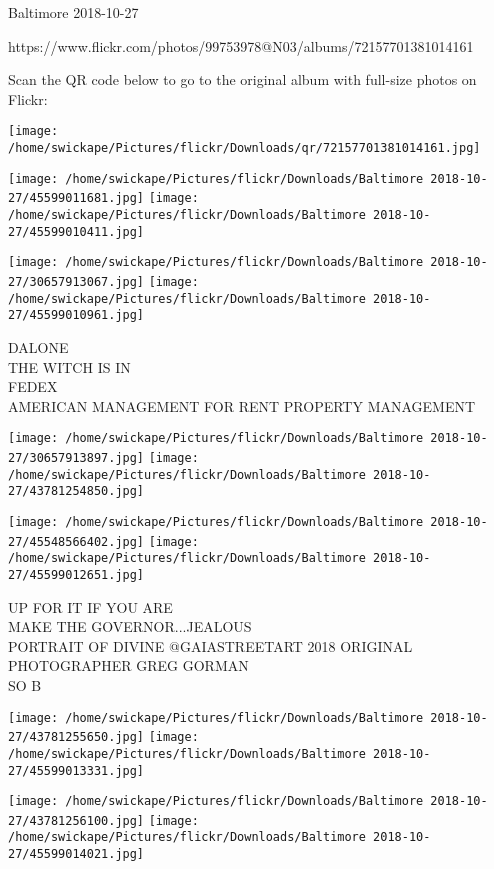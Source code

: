 \documentclass[10pt,letterpaper]{article}
\begin{document}
Baltimore 2018-10-27

https://www.flickr.com/photos/99753978@N03/albums/72157701381014161

Scan the QR code below to go to the original album with full-size photos on Flickr:

\texttt{[image: /home/swickape/Pictures/flickr/Downloads/qr/72157701381014161.jpg]}
\pagebreak

\texttt{[image: /home/swickape/Pictures/flickr/Downloads/Baltimore 2018-10-27/45599011681.jpg]}
\texttt{[image: /home/swickape/Pictures/flickr/Downloads/Baltimore 2018-10-27/45599010411.jpg]}

\texttt{[image: /home/swickape/Pictures/flickr/Downloads/Baltimore 2018-10-27/30657913067.jpg]}
\texttt{[image: /home/swickape/Pictures/flickr/Downloads/Baltimore 2018-10-27/45599010961.jpg]}

DALONE\\
THE WITCH IS IN\\
FEDEX\\
AMERICAN MANAGEMENT FOR RENT PROPERTY MANAGEMENT\\
\pagebreak

\texttt{[image: /home/swickape/Pictures/flickr/Downloads/Baltimore 2018-10-27/30657913897.jpg]}
\texttt{[image: /home/swickape/Pictures/flickr/Downloads/Baltimore 2018-10-27/43781254850.jpg]}

\texttt{[image: /home/swickape/Pictures/flickr/Downloads/Baltimore 2018-10-27/45548566402.jpg]}
\texttt{[image: /home/swickape/Pictures/flickr/Downloads/Baltimore 2018-10-27/45599012651.jpg]}

UP FOR IT IF YOU ARE\\
MAKE THE GOVERNOR...JEALOUS\\
PORTRAIT OF DIVINE @GAIASTREETART 2018 ORIGINAL PHOTOGRAPHER GREG GORMAN\\
SO B\\
\pagebreak

\texttt{[image: /home/swickape/Pictures/flickr/Downloads/Baltimore 2018-10-27/43781255650.jpg]}
\texttt{[image: /home/swickape/Pictures/flickr/Downloads/Baltimore 2018-10-27/45599013331.jpg]}

\texttt{[image: /home/swickape/Pictures/flickr/Downloads/Baltimore 2018-10-27/43781256100.jpg]}
\texttt{[image: /home/swickape/Pictures/flickr/Downloads/Baltimore 2018-10-27/45599014021.jpg]}
\end{document}
